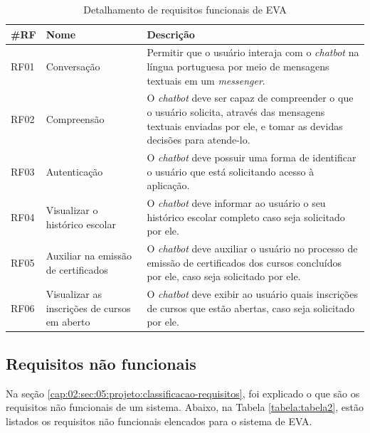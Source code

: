 \begin{table}[htb]
\caption{Detalhamento de requisitos funcionais de EVA}
\label{tabela:tabela1}
\centering
\medskip
\begin{tabular}{|p{1.2cm}|p{3.5cm}|p{7.5cm}|}
  \hline
   \textbf{\#RF} & \textbf{Nome}  & \textbf{Descrição}  \\
    \hline
    RF01 & Conversação & Permitir que o usuário interaja com o \textit{chatbot} na língua portuguesa por meio de mensagens textuais em um \textit{messenger}. \\
    \hline
    RF02 & Compreensão & O \textit{chatbot} deve ser capaz de compreender o que o usuário solicita, através das mensagens textuais enviadas por ele, e tomar as devidas decisões para atende-lo. \\
    \hline
    RF03 & Autenticação & O \textit{chatbot} deve possuir uma forma de identificar o usuário que está solicitando acesso à aplicação. \\
   \hline
     RF04 & Visualizar o histórico escolar & O \textit{chatbot} deve informar ao usuário o seu histórico escolar completo caso seja solicitado por ele. \\
   \hline
    RF05 & Auxiliar na emissão de certificados & O \textit{chatbot} deve auxiliar o usuário no processo de emissão de certificados dos cursos concluídos por ele, caso seja solicitado por ele. \\
   \hline
    RF06 & Visualizar as inscrições de cursos em aberto & O \textit{chatbot} deve exibir ao usuário quais inscrições de cursos que estão abertas, caso seja solicitado por ele. \\
   \hline
\end{tabular}
\end{table}

\subsection{Requisitos não funcionais}\label{cap3-requisitos-nao-funcionais}

Na seção \ref{cap:02:sec:05:projeto:classificacao-requisitos}, foi explicado o que são os requisitos não funcionais de um sistema. 
Abaixo, na Tabela \ref{tabela:tabela2}, estão listados os requisitos não funcionais elencados para o sistema de EVA.

